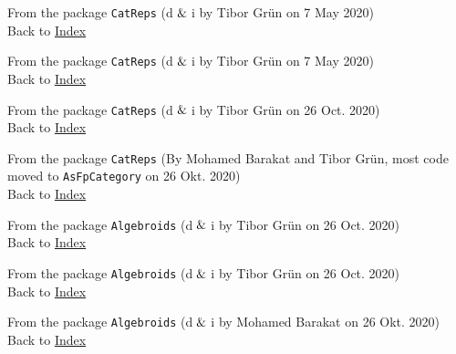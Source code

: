 
From the package \texttt{CatReps} (d$\And$i by Tibor Grün on 7 May 2020) \\
Back to \hyperref[lol]{Index}
		

From the package \texttt{CatReps} (d$\And$i by Tibor Grün on 7 May 2020) \\
Back to \hyperref[lol]{Index}
		

From the package \texttt{CatReps} (d$\And$i by Tibor Grün on 26 Oct. 2020) \\
Back to \hyperref[lol]{Index}


From the package \texttt{CatReps} (By Mohamed Barakat and Tibor Grün, most code moved to \texttt{AsFpCategory} on 26 Okt. 2020) \\
Back to \hyperref[lol]{Index}


From the package \texttt{Algebroids} (d$\And$i by Tibor Grün on 26 Oct. 2020) \\
Back to \hyperref[lol]{Index}


From the package \texttt{Algebroids} (d$\And$i by Tibor Grün on 26 Oct. 2020) \\
Back to \hyperref[lol]{Index}


From the package \texttt{Algebroids} (d$\And$i by Mohamed Barakat on 26 Okt. 2020) \\
Back to \hyperref[lol]{Index}
		
